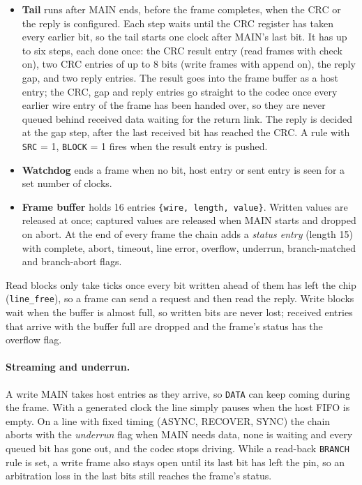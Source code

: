 \documentclass[11pt,a4paper]{article}
\newcommand{\sig}[1]{\texttt{#1}}
\begin{document}
\begin{itemize}
\item \textbf{Tail} runs after MAIN ends, before the frame completes, when the CRC or the reply is configured. Each step waits until the CRC register has taken every earlier bit, so the tail starts one clock after MAIN's last bit. It has up to six steps, each done once: the CRC result entry (read frames with check on), two CRC entries of up to 8 bits (write frames with append on), the reply gap, and two reply entries. The result goes into the frame buffer as a host entry; the CRC, gap and reply entries go straight to the codec once every earlier wire entry of the frame has been handed over, so they are never queued behind received data waiting for the return link. The reply is decided at the gap step, after the last received bit has reached the CRC. A rule with \sig{SRC} = 1, \sig{BLOCK} = 1 fires when the result entry is pushed.
\item \textbf{Watchdog} ends a frame when no bit, host entry or sent entry is seen for a set number of clocks.
\item \textbf{Frame buffer} holds 16 entries \texttt{\{wire, length, value\}}. Written values are released at once; captured values are released when MAIN starts and dropped on abort. At the end of every frame the chain adds a \emph{status entry} (length 15) with complete, abort, timeout, line error, overflow, underrun, branch-matched and branch-abort flags.
\end{itemize}

Read blocks only take ticks once every bit written ahead of them has left the chip (\sig{line\_free}), so a frame can send a request and then read the reply. Write blocks wait when the buffer is almost full, so written bits are never lost; received entries that arrive with the buffer full are dropped and the frame's status has the overflow flag.

\paragraph{Streaming and underrun.} A write MAIN takes host entries as they arrive, so \sig{DATA} can keep coming during the frame. With a generated clock the line simply pauses when the host FIFO is empty. On a line with fixed timing (ASYNC, RECOVER, SYNC) the chain aborts with the \emph{underrun} flag when MAIN needs data, none is waiting and every queued bit has gone out, and the codec stops driving. While a read-back \sig{BRANCH} rule is set, a write frame also stays open until its last bit has left the pin, so an arbitration loss in the last bits still reaches the frame's status.
\end{document}
